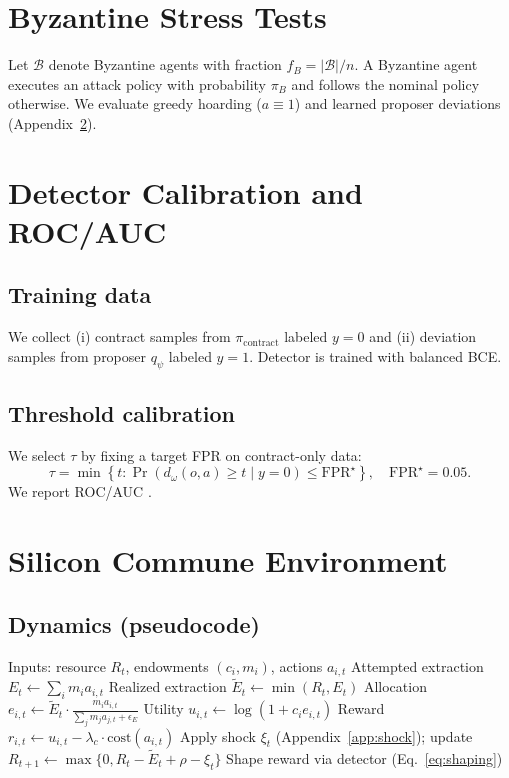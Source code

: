 \documentclass{article}
\theoremstyle{definition}
\theoremstyle{plain}
\theoremstyle{remark}
\begin{document}
\section{Byzantine Stress Tests}
\label{app:byzantine}

Let $\mathcal{B}$ denote Byzantine agents with fraction $f_B=|\mathcal{B}|/n$.
A Byzantine agent executes an attack policy with probability $\pi_B$ and follows the nominal policy otherwise.
We evaluate greedy hoarding ($a\equiv 1$) and learned proposer deviations (Appendix~\ref{app:detector}).

\section{Detector Calibration and ROC/AUC}
\label{app:detector}

\subsection{Training data}
We collect (i) contract samples from $\pi_{\text{contract}}$ labeled $y=0$ and (ii) deviation samples from proposer $q_\psi$ labeled $y=1$.
Detector is trained with balanced BCE.

\subsection{Threshold calibration}
We select $\tau$ by fixing a target FPR on contract-only data:
\[
\tau = \min\left\{t:\Pr(d_\omega(o,a)\ge t \mid y=0)\le \mathrm{FPR}^\star\right\},
\quad \mathrm{FPR}^\star=0.05.
\]
We report ROC/AUC \citep{fawcett2006roc}.

\section{Silicon Commune Environment}
\label{app:env}

\subsection{Dynamics (pseudocode)}
\begin{algorithm}[H]
\caption{Silicon Commune Step (pseudocode)}
\label{alg:commune_step}
\begin{algorithmic}[1]
\STATE Inputs: resource $R_t$, endowments $(c_i,m_i)$, actions $a_{i,t}$
\STATE Attempted extraction $E_t \leftarrow \sum_i m_i a_{i,t}$
\STATE Realized extraction $\tilde{E}_t \leftarrow \min(R_t, E_t)$
  \STATE Allocation $e_{i,t} \leftarrow \tilde{E}_t \cdot \frac{m_i a_{i,t}}{\sum_j m_j a_{j,t}+\epsilon_E}$
  \STATE Utility $u_{i,t}\leftarrow \log(1+c_i e_{i,t})$
  \STATE Reward $r_{i,t}\leftarrow u_{i,t}-\lambda_c\cdot \mathrm{cost}(a_{i,t})$
\ENDFOR
\STATE Apply shock $\xi_t$ (Appendix~\ref{app:shock}); update $R_{t+1}\leftarrow \max\{0, R_t-\tilde{E}_t+\rho-\xi_t\}$
\STATE Shape reward via detector (Eq.~\ref{eq:shaping})
\end{algorithmic}
\end{algorithm}
\end{document}
